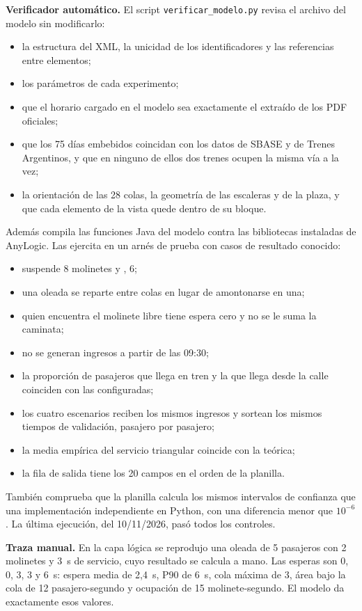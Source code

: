\textbf{Verificador automático.} El script \texttt{verificar\_modelo.py} revisa el archivo del modelo sin
modificarlo:
\begin{itemize}
  \item la estructura del XML, la unicidad de los identificadores y las referencias entre elementos;
  \item los parámetros de cada experimento;
  \item que el horario cargado en el modelo sea exactamente el extraído de los PDF oficiales;
  \item que los 75 días embebidos coincidan con los datos de SBASE y de Trenes Argentinos, y que en ninguno de
        ellos dos trenes ocupen la misma vía a la vez;
  \item la orientación de las 28 colas, la geometría de las escaleras y de la plaza, y que cada elemento de la
        vista quede dentro de su bloque.
\end{itemize}
Además compila las funciones Java del modelo contra las bibliotecas instaladas de AnyLogic. Las ejercita
en un arnés de prueba con casos de resultado conocido:
\begin{itemize}
  \item \EO{} suspende 8 molinetes y \EI{}, 6;
  \item una oleada se reparte entre colas en lugar de amontonarse en una;
  \item quien encuentra el molinete libre tiene espera cero y no se le suma la caminata;
  \item no se generan ingresos a partir de las 09:30;
  \item la proporción de pasajeros que llega en tren y la que llega desde la calle coinciden con las
        configuradas;
  \item los cuatro escenarios reciben los mismos ingresos y sortean los mismos tiempos de validación, pasajero
        por pasajero;
  \item la media empírica del servicio triangular coincide con la teórica;
  \item la fila de salida tiene los 20 campos en el orden de la planilla.
\end{itemize}
También comprueba que la planilla calcula los mismos intervalos de confianza que una implementación
independiente en Python, con una diferencia menor que $10^{-6}$. La última ejecución, del 10/11/2026,
pasó todos los controles.

\textbf{Traza manual.} En la capa lógica se reprodujo una oleada de 5 pasajeros con 2 molinetes y 3~s de
servicio, cuyo resultado se calcula a mano. Las esperas son 0, 0, 3, 3 y 6~s: espera media de 2,4~s, P90
de 6~s, cola máxima de 3, área bajo la cola de 12 pasajero-segundo y ocupación de 15 molinete-segundo. El
modelo da exactamente esos valores.

